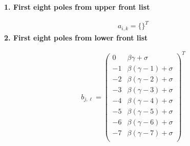 \documentclass[11pt]{article}
\begin{document}
\noindent\textbf{1. First eight poles from upper front list}

\begin{align*}
  a_{i,k} = 
  \{\}^T 
\end{align*}
\noindent\textbf{2. First eight poles from lower front list}

\begin{align*}
  b_{j,\ell} = 
  \left(
\begin{array}{cc}
 0 & \beta  \gamma +\sigma  \\
 -1 & \beta  (\gamma -1)+\sigma  \\
 -2 & \beta  (\gamma -2)+\sigma  \\
 -3 & \beta  (\gamma -3)+\sigma  \\
 -4 & \beta  (\gamma -4)+\sigma  \\
 -5 & \beta  (\gamma -5)+\sigma  \\
 -6 & \beta  (\gamma -6)+\sigma  \\
 -7 & \beta  (\gamma -7)+\sigma  \\
\end{array}
\right)^T 
\end{align*}

\printbibliography[title={References}]
\end{document}
